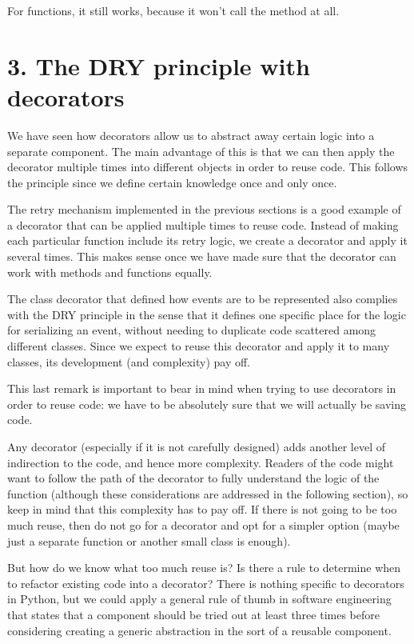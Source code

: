 \documentclass[a4paper,10pt,english]{sphinxmanual}
\begin{document}
For functions, it still works, because it won’t call the  method at all.


\section{3. The DRY principle with decorators}
\label{\detokenize{chapters/5_decorators/index:the-dry-principle-with-decorators}}
We have seen how decorators allow us to abstract away certain logic into a separate
component. The main advantage of this is that we can then apply the decorator multiple
times into different objects in order to reuse code. This follows the  principle since we define certain knowledge once and only once.

The retry mechanism implemented in the previous sections is a good example of a
decorator that can be applied multiple times to reuse code. Instead of making each
particular function include its retry logic, we create a decorator and apply it several times.
This makes sense once we have made sure that the decorator can work with methods and
functions equally.

The class decorator that defined how events are to be represented also complies with the
DRY principle in the sense that it defines one specific place for the logic for serializing an
event, without needing to duplicate code scattered among different classes. Since we expect
to reuse this decorator and apply it to many classes, its development (and complexity) pay
off.

This last remark is important to bear in mind when trying to use decorators in order to
reuse code: we have to be absolutely sure that we will actually be saving code.

Any decorator (especially if it is not carefully designed) adds another level of indirection to
the code, and hence more complexity. Readers of the code might want to follow the path of
the decorator to fully understand the logic of the function (although these considerations
are addressed in the following section), so keep in mind that this complexity has to pay off.
If there is not going to be too much reuse, then do not go for a decorator and opt for a
simpler option (maybe just a separate function or another small class is enough).

But how do we know what too much reuse is? Is there a rule to determine when to refactor
existing code into a decorator? There is nothing specific to decorators in Python, but we
could apply a general rule of thumb in software engineering that states that a
component should be tried out at least three times before considering creating a generic
abstraction in the sort of a reusable component.
\end{document}
